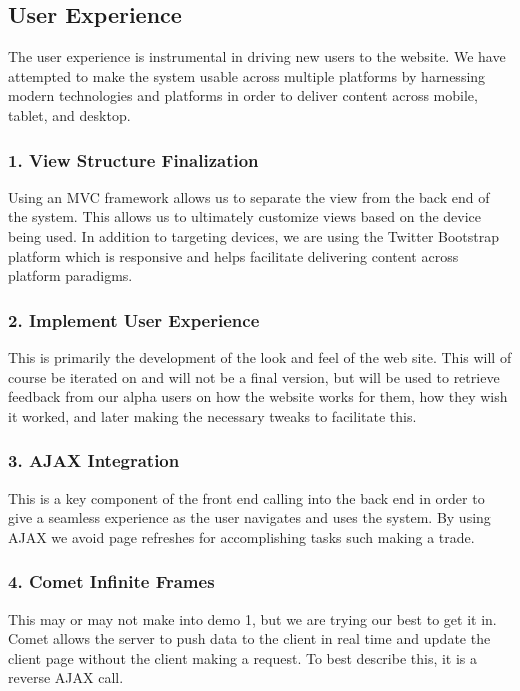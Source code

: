 \subsection{User Experience}
The user experience is instrumental in driving new users to the website.  We
have attempted to make the system usable across multiple platforms by harnessing
modern technologies and platforms in order to deliver content across mobile,
tablet, and desktop.\\

\subsubsection{1. View Structure Finalization}
Using an MVC framework allows us to separate the view from the back end of the
system.  This allows us to ultimately customize views based on the device being
used.  In addition to targeting devices, we are using the Twitter Bootstrap
platform which is responsive and helps facilitate delivering content across
platform paradigms.
\subsubsection{2. Implement User Experience}
This is primarily the development of the look and feel of the web site.  This
will of course be iterated on and will not be a final version, but will be used
to retrieve feedback from our alpha users on how the website works for them, how
they wish it worked, and later making the necessary tweaks to facilitate this.\\
\subsubsection{3. AJAX Integration}
This is a key component of the front end calling into the back end in order to
give a seamless experience as the user navigates and uses the system.  By using
AJAX we avoid page refreshes for accomplishing tasks such making a trade.\\
\subsubsection{4. Comet Infinite Frames}
This may or may not make into demo 1, but we are trying our best to get it in.
Comet\cite{wiki:comt} allows the server to push data to the client in real time
and update the client page without the client making a request. To best describe
this, it is a reverse AJAX call.

